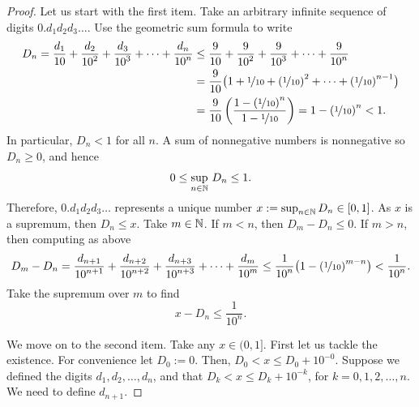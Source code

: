 \begin{proof}
Let us start with the first item.  Take an arbitrary infinite sequence of
digits $0.d_1d_2d_3\ldots$.  Use the geometric sum formula to write
\begin{equation*}
\begin{split}
D_n =
\frac{d_1}{10} + 
\frac{d_2}{{10}^2} + 
\frac{d_3}{{10}^3} + 
\cdots +
\frac{d_n}{{10}^n} 
& \leq
\frac{9}{10} + 
\frac{9}{{10}^2} + 
\frac{9}{{10}^3} + 
\cdots +
\frac{9}{{10}^n} 
\\
& =
\frac{9}{10}
\bigl( 1 + \nicefrac{1}{10} + 
{(\nicefrac{1}{10})}^2 + \cdots + 
{(\nicefrac{1}{10})}^{n-1} \bigr)
\\
& =
\frac{9}{10}
\left(
\frac{1-{(\nicefrac{1}{10})}^{n}}{1-\nicefrac{1}{10}}
\right)
= 1-{(\nicefrac{1}{10})}^{n}
< 1 .
\end{split}
\end{equation*}
In particular, $D_n < 1$ for all $n$.  A sum of nonnegative numbers is
nonnegative so $D_n \geq 0$, and hence
\begin{equation*}
0 \leq \sup_{n\in {\mathbb{N}}} \, D_n \leq 1 .
\end{equation*}
Therefore, $0.d_1d_2d_3\ldots$ represents a unique number $x := \sup_{n\in
{\mathbb{N}}} D_n \in [0,1]$.
As $x$ is a supremum, then $D_n \leq x$.
Take $m \in {\mathbb{N}}$.  If $m < n$, then $D_m - D_n \leq 0$.  If $m > n$, then
computing as above
\begin{equation*}
D_m - D_n
=
\frac{d_{n+1}}{{10}^{n+1}} + 
\frac{d_{n+2}}{{10}^{n+2}} + 
\frac{d_{n+3}}{{10}^{n+3}} + 
\cdots +
\frac{d_{m}}{{10}^m} 
\leq
\frac{1}{{10}^{n}}
\bigl(
1-{(\nicefrac{1}{10})}^{m-n}
\bigr)
<
\frac{1}{{10}^{n}} .
\end{equation*}
Take the supremum over $m$ to find
\begin{equation*}
x - D_n
\leq
\frac{1}{{10}^{n}} .
\end{equation*}

We move on to the
second item.  Take any $x \in (0,1]$.
First let us tackle the existence.
For convenience let $D_0 := 0$.
Then,
$D_0 < x \leq D_0 + {10}^{-0}$.
Suppose we defined the digits $d_1,d_2,\ldots,d_n$,
and that 
$D_k < x \leq D_k + {10}^{-k}$, for $k=0,1,2,\ldots,n$.  We need to define $d_{n+1}$.


\end{proof}
